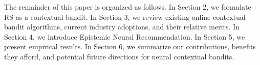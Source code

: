 The remainder of this paper is organized as follows. In Section 2, we formulate RS as a contextual bandit. In Section 3, we review existing online contextual bandit algorithms, current industry adoptions, and their relative merits. In Section 4, we introduce Epistemic Neural Recommendation. In Section 5, we present empirical results.  In Section 6, we summarize our contributions, benefits they afford, and potential future directions for neural contextual bandits.


